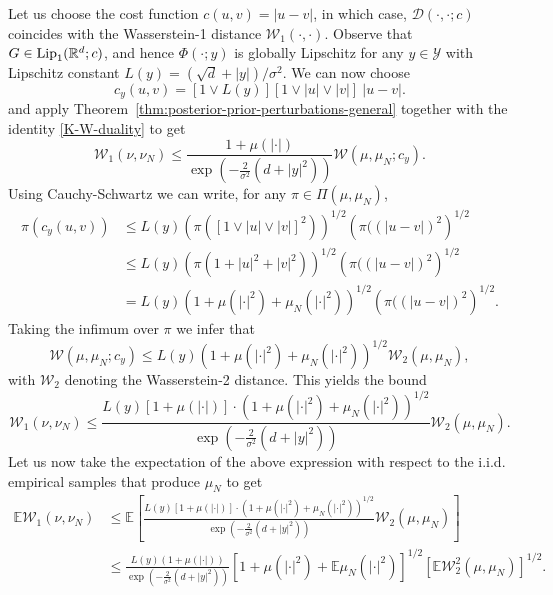 \documentclass[final]{siamart171218}
\newcommand{\mcl}{\mathcal}
\newcommand{\mbb}{\mathbb}
\newcommand{\Lip}{{\rm Lip}_1}
\newcommand{\R}{\mbb{R}}
\newcommand{\mY}{\mcl{Y}}
\newcommand{\EE}{\mbb{E}}
\newcommand{\cc}{c}
\newcommand{\D}{\mathcal{D}}
\newcommand{\W}{\mathcal{W}}
\begin{document}
Let us choose the cost function $c(u,v) = | u - v|$, in which case, $\D(\cdot, \cdot; \cc)$
coincides with the Wasserstein-1 distance $\W_1(\cdot, \cdot)$. Observe that 
$G\in \Lip(\R^d; \cc)$, and hence 
$\Phi(\cdot;y)$ is globally Lipschitz for any $y\in\mY$ with Lipschitz constant $L(y) = (\sqrt{d}+|y|)/\sigma^2$. 
We can now choose 
\begin{equation*}
    c_y(u,v) =  [1\vee L(y)] [1 \vee |u| \vee |v|] \: |u -v|. 
\end{equation*}
and apply Theorem~\ref{thm:posterior-prior-perturbations-general} 
together with the identity \eqref{K-W-duality} to get 
\begin{equation*}
    \W_1(\nu, \nu_N) \le 
    \frac{1 + \mu( |\cdot |)}{ \exp\left( - \frac 2{\sigma^2}( d + | y|^2)\right) }
    \W(\mu, \mu_N; c_y). 
\end{equation*}
Using Cauchy-Schwartz we can write, for any $\pi \in \Pi(\mu, \mu_N)$,
\begin{equation*}
    \begin{aligned}
    \pi(  c_y(u,v) ) & \le L(y) \left( \pi \left( [1 \vee |u| \vee |v|]^2 \right)  \right)^{1/2}
    \left( \pi( (|u -v|)^2  \right)^{1/2} \\
    & \le  L(y)\left( \pi\left( 1 + |u|^2 + |v|^2 \right)  \right)^{1/2}
    \left( \pi( (|u -v|)^2  \right)^{1/2} \\
    & =  L(y)\left( 1 +  \mu( | \cdot |^2) + \mu_N( | \cdot |^2)\right)^{1/2}
    \left( \pi( (|u -v|)^2  \right)^{1/2}. 
    \end{aligned}
\end{equation*}
Taking the infimum over $\pi$ we 
infer that 
\begin{equation*}
\W(\mu, \mu_N; c_y) \le L(y)\left( 1 +  \mu( | \cdot |^2) + \mu_N( | \cdot |^2)\right)^{1/2} 
\W_2( \mu, \mu_N),
\end{equation*}
with $\W_2$ denoting the Wasserstein-2 
distance. This yields the bound 
\begin{equation}\label{eq:w-1-w-2-bound}
        \W_1(\nu, \nu_N) \le 
    \frac{ L(y)\left[ 1 + \mu( |\cdot |) \right] \cdot \left( 1 +  \mu( | \cdot |^2) + \mu_N( | \cdot |^2)\right)^{1/2}}{ \exp\left( - \frac 2{\sigma^2}( d + | y|^2)\right) }
    \W_2(\mu, \mu_N).
\end{equation}
Let us now take the expectation of the above expression with respect to the 
i.i.d. empirical samples that produce $\mu_N$ to get 
\begin{equation*}
\begin{aligned}
        \EE \W_1(\nu, \nu_N) & \le 
 \EE  \left[   \frac{ L(y)\left[ 1 + \mu( |\cdot |) \right] \cdot 
 \left( 1 +  \mu( | \cdot |^2) + \mu_N( | \cdot |^2)\right)^{1/2}}{ \exp\left( - \frac 2{\sigma^2}( d + | y|^2)\right)}
    \W_2(\mu, \mu_N) \right] \\
    &\le \frac{L(y)(1 + \mu( |\cdot |))}{\exp\left( - \frac 2{\sigma^2}( d + | y|^2)\right)} 
    \left[ 1 +  \mu( | \cdot |^2) + \EE \mu_N( | \cdot |^2) \right]^{1/2} 
    \left[ \EE \W^2_2(\mu, \mu_N) \right]^{1/2}.
\end{aligned}
\end{equation*}
\end{document}
